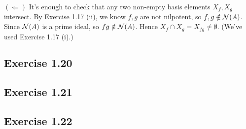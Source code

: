 \documentclass[../A&M.tex]{subfiles}
\begin{document}
$(\Leftarrow)$ It's enough to check that any two non-empty basis elements $X_f,X_g$ intersect. By Exercise 1.17 (ii), we know $f,g$ are not nilpotent, so $f,g\notin\mathcal{N}(A)$. Since $\mathcal{N}(A)$ is a prime ideal, so $fg\notin\mathcal{N}(A)$. Hence $X_f \cap X_g = X_{fg}\neq\emptyset$. (We've used Exercise 1.17 (i).)

\subsection*{Exercise 1.20}

\subsection*{Exercise 1.21}

\begin{comment}
(i) $\qfk\in\phi^{*^{-1}}(X_f) \iff \phi^*(\qfk) = \phi^{-1}(\qfk) \in X_f \iff f\notin \phi^{-1}(\qfk) \iff \phi(f)\notin\qfk \iff \qfk\in Y_{\phi(f)}$.

(ii) Note that $\qfk\in\phi^{*^{-1}}(V(\afk)) \iff \phi^*(\qfk) = \phi^{-1}(\qfk) =\qfk^c \in V(\afk) \iff \afk\sbe q^c$. So it's remaining to show that $\afk\sbe \qfk^c$ if and only if $\afk^e \sbe \qfk$. By (1.17) (i), if $\afk\sbe\qfk^c$, then $\afk^e\sbe\qfk^{ce} \sbe \qfk$. And conversely, if $\afk^e \sbe \qfk$, then $\afk \sbe \afk^{ec} \sbe \qfk^c$.

(iii) First, we claim that $\phi^*(V(\bfk)) \sbe V(\bfk^c)$. (Then $\ovl{\phi^*(V(\bfk))}  \sbe V(\bfk^c)$.) If $\pfk \in \phi^*(V(\bfk))$, then there exists $\qfk\spe\bfk$ s.t. $\phi^*(\qfk)=\pfk$. So $\bfk^c \sbe \qfk^c = \phi^{-1}(\qfk) = \phi^*(\qfk)=\pfk$ and hence $\pfk\in V(\bfk^c)$.

Conversely, let $V(\afk)$ be any closed set s.t. $\phi^*(V(\bfk)) \sbe V(\afk)$. We claim that $V(\bfk^c) \sbe V(\afk)$. (Then $\ovl{\phi^*(V(\bfk))}  \spe V(\bfk^c)$.) Given $\pfk \in V(\bfk^c)$. By Exercise 1.15 (i) and (1.18), we have $V(\bfk^c) = V(r(\bfk^c)) = V(r(\bfk)^c)$. So $\pfk\in V(r(\bfk)^c)$. By (1.14) and (1.13) (i),
$$
\pfk \spe r(\bfk)^c = \left( \bigcap_{\qfk \in V(\bfk)} \qfk \right)^c = \bigcap_{\qfk \in V(\bfk)} \qfk^c = \bigcap_{\qfk \in V(\bfk)} \phi^*(\qfk) = \bigcap_{\pfk \in \phi^*(V(\bfk))} \pfk \spe \bigcap_{\pfk \in V(\afk)} \pfk = r(\afk) \spe \afk 
$$
Thus, $\pfk\in V(\afk)$.
\end{comment}

\subsection*{Exercise 1.22}
\end{document}
